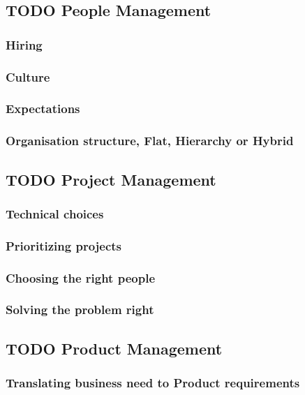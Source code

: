 \documentclass[12pt,conference]{IEEEtran}
\begin{document}
\subsection*{TODO People Management}

\subsubsection*{Hiring}
\subsubsection*{Culture}
\subsubsection*{Expectations}
\subsubsection*{Organisation structure, Flat, Hierarchy or Hybrid}

\subsection*{TODO Project Management}

\subsubsection*{Technical choices}
\subsubsection*{Prioritizing projects}
\subsubsection*{Choosing the right people}
\subsubsection*{Solving the problem right}

\subsection*{TODO Product Management}

\subsubsection*{Translating business need to Product requirements}
\end{document}
